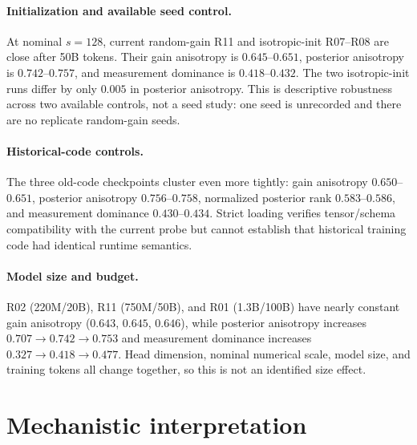 \documentclass[11pt]{article}
\begin{document}
\paragraph{Initialization and available seed control.}
At nominal $s=128$, current random-gain R11 and isotropic-init R07--R08 are close after 50B
tokens.  Their gain anisotropy is $0.645$--$0.651$, posterior anisotropy is
$0.742$--$0.757$, and measurement dominance is $0.418$--$0.432$.  The two isotropic-init
runs differ by only $0.005$ in posterior anisotropy.  This is descriptive robustness across
two available controls, not a seed study: one seed is unrecorded and there are no replicate
random-gain seeds.

\paragraph{Historical-code controls.}
The three old-code checkpoints cluster even more tightly: gain anisotropy
$0.650$--$0.651$, posterior anisotropy $0.756$--$0.758$, normalized posterior rank
$0.583$--$0.586$, and measurement dominance $0.430$--$0.434$.  Strict loading verifies
tensor/schema compatibility with the current probe but cannot establish that historical
training code had identical runtime semantics.

\paragraph{Model size and budget.}
R02 (220M/20B), R11 (750M/50B), and R01 (1.3B/100B) have nearly constant gain anisotropy
($0.643$, $0.645$, $0.646$), while posterior anisotropy increases
$0.707\rightarrow0.742\rightarrow0.753$ and measurement dominance increases
$0.327\rightarrow0.418\rightarrow0.477$.  Head dimension, nominal numerical scale, model
size, and training tokens all change together, so this is not an identified size effect.

\section{Mechanistic interpretation}
\end{document}
